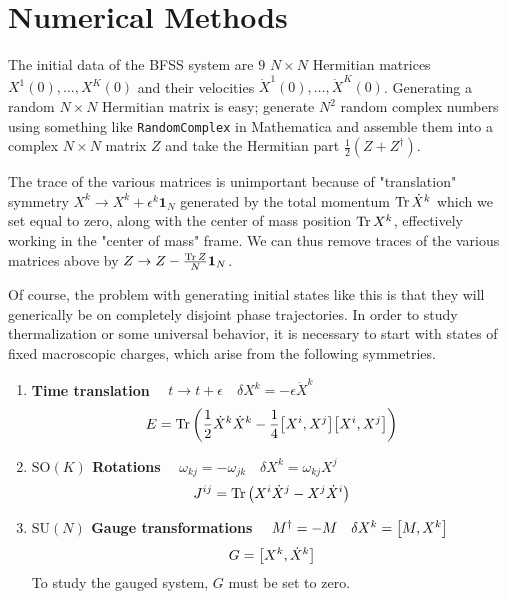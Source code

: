 \chapter{Numerical Methods}
\label{app:numerical-methods}

The initial data of the BFSS system are $9$ $N \times N$ Hermitian matrices $X^{1}(0), \ldots, X^{K}(0)$ and their velocities $\dot{X}^{1}(0), \ldots, \dot{X}^{K}(0)$. Generating a random $N \times N$ Hermitian matrix is easy; generate $N^2$ random complex numbers using something like \texttt{RandomComplex} in Mathematica and assemble them into a complex $N \times N$ matrix $Z$ and take the Hermitian part $\frac{1}{2}(Z + Z^{\dagger})$.

The trace of the various matrices is unimportant because of "translation" symmetry $X^{k} \to X^{k} + \epsilon^{k} \boldsymbol{1}_N$ generated by the total momentum $\Tr \dot{X}^{k}$ which we set equal to zero, along with the center of mass position $\Tr X^{k}$, effectively working in the "center of mass" frame. We can thus remove traces of the various matrices above by $Z \to Z - \frac{\Tr Z}{N} \boldsymbol{1}_N $.

Of course, the problem with generating initial states like this is that they will generically be on completely disjoint phase trajectories. In order to study thermalization or some universal behavior, it is necessary to start with states of fixed macroscopic charges, which arise from the following symmetries.

\begin{enumerate}
  \item \textbf{Time translation} $\quad t \to t + \epsilon \quad \delta X^{k} = -\epsilon \dot{X}^{k}$
    \begin{equation}
      E = \Tr \left( \frac{1}{2} \dot{X}^{k} \dot{X}^{k} - \frac{1}{4} \comm{X^{i}}{X^{j}} \comm{X^{i}}{X^{j}} \right)
    \end{equation}
  \item \textbf{$\mathrm{SO}(K)$ Rotations} $\quad \omega_{k j} = -\omega_{j k} \quad \delta X^{k} = \omega_{k j} X^{j}$
    \begin{equation}
      J^{i j} = \Tr \left( X^{i} \dot{X}^{j} - X^{j} \dot{X}^{i} \right)
    \end{equation}
  \item \textbf{$\mathrm{SU}(N)$ Gauge transformations} $\quad M^{\dagger} = -M \quad \delta X^{k} = \comm{M}{X^{k}}$
    \begin{equation}
      G = \comm{X^{k}}{\dot{X}^{k}}
    \end{equation}
    To study the gauged system, $G$ must be set to zero.
\end{enumerate}

